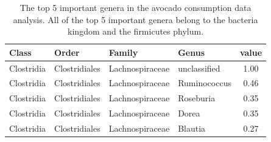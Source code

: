 \documentclass[smallextended]{svjour3}
\begin{document}
\begin{table}[h]
    \centering
\begin{tabular}{l l l l c}
\hline
Class & Order & Family & Genus & value\\
\hline
Clostridia & Clostridiales & Lachnospiraceae & unclassified & 1.00\\
Clostridia & Clostridiales & Lachnospiraceae & Ruminococcus & 0.46\\
Clostridia & Clostridiales & Lachnospiraceae & Roseburia & 0.35\\
Clostridia & Clostridiales & Lachnospiraceae & Dorea & 0.35\\
Clostridia & Clostridiales & Lachnospiraceae & Blautia & 0.27\\
\hline
\end{tabular}
\caption{The top 5 important genera in the avocado consumption data analysis. All of the top 5 important genera belong to the bacteria kingdom and the firmicutes phylum.}\label{AvocadoFI}
\end{table}

\clearpage



\end{document}
